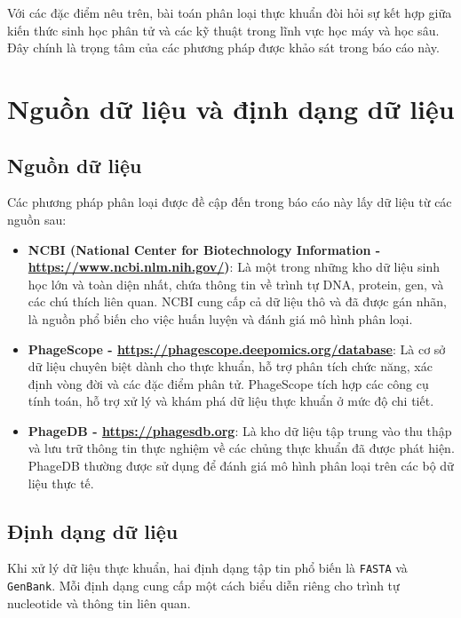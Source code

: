 Với các đặc điểm nêu trên, bài toán phân loại thực khuẩn đòi hỏi sự kết hợp giữa kiến thức sinh học phân tử và các kỹ thuật trong lĩnh vực học máy và học sâu. Đây chính là trọng tâm của các phương pháp được khảo sát trong báo cáo này.

\section{Nguồn dữ liệu và định dạng dữ liệu}

\subsection{Nguồn dữ liệu}

Các phương pháp phân loại được đề cập đến trong báo cáo này lấy dữ liệu từ các nguồn sau:

\begin{itemize}
    \item \textbf{NCBI (National Center for Biotechnology Information - \url{https://www.ncbi.nlm.nih.gov/})}: Là một trong những kho dữ liệu sinh học lớn và toàn diện nhất, chứa thông tin về trình tự DNA, protein, gen, và các chú thích liên quan. NCBI cung cấp cả dữ liệu thô và đã được gán nhãn, là nguồn phổ biến cho việc huấn luyện và đánh giá mô hình phân loại.
    
    \item \textbf{PhageScope - \url{https://phagescope.deepomics.org/database}}: Là cơ sở dữ liệu chuyên biệt dành cho thực khuẩn, hỗ trợ phân tích chức năng, xác định vòng đời và các đặc điểm phân tử. PhageScope tích hợp các công cụ tính toán, hỗ trợ xử lý và khám phá dữ liệu thực khuẩn ở mức độ chi tiết.
    
    \item \textbf{PhageDB - \url{https://phagesdb.org}}: Là kho dữ liệu tập trung vào thu thập và lưu trữ thông tin thực nghiệm về các chủng thực khuẩn đã được phát hiện. PhageDB thường được sử dụng để đánh giá mô hình phân loại trên các bộ dữ liệu thực tế.
\end{itemize}

\subsection{Định dạng dữ liệu}

Khi xử lý dữ liệu thực khuẩn, hai định dạng tập tin phổ biến là \texttt{FASTA} và \texttt{GenBank}. Mỗi định dạng cung cấp một cách biểu diễn riêng cho trình tự nucleotide và thông tin liên quan.

